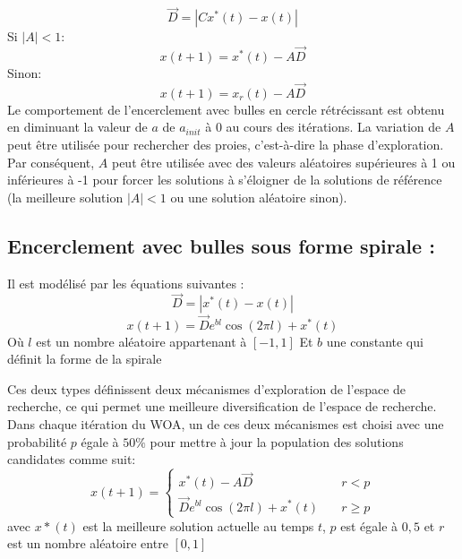 \documentclass[12pt]{article}
\begin{document}
\begin{equation*}
    \vec{D} = |Cx^*(t) - x(t)|
\end{equation*}
Si \(|A| < 1\):
\begin{equation}
    x(t+1) = x^*(t) - A\vec{D}
\end{equation}
Sinon:
\begin{equation}
    x(t+1) = x_r(t) - A\vec{D}
\end{equation}
Le comportement de l’encerclement avec bulles en cercle rétrécissant est obtenu en diminuant la valeur de \(a\) de \(a_{init}\) à 0 au cours des itérations. La variation de \(A\) peut être utilisée pour rechercher des proies, c'est-à-dire la phase d'exploration. Par conséquent, \(A\) peut être utilisée avec des valeurs aléatoires supérieures à 1 ou inférieures à -1 pour forcer les solutions à s'éloigner de la solutions de référence (la meilleure solution \(|A| < 1\) ou une solution aléatoire sinon).
\subsection{Encerclement avec bulles sous forme spirale :}
Il est modélisé par les équations suivantes :
\begin{equation}
    \vec{D} = |x^*(t) - x(t)|
\end{equation}
\begin{equation}
    x(t+1) = \vec{D} e^{bl} \cos (2\pi l) + x^*(t)
\end{equation}
Où \(l\) est un nombre aléatoire appartenant à \([-1,1]\) Et \(b\) une constante qui définit la forme de la spirale 

Ces deux types définissent deux mécanismes d’exploration de l’espace de recherche, ce qui permet une meilleure diversification de l’espace de recherche.
Dans chaque itération du WOA, un de ces deux mécanismes est choisi avec une probabilité \(p\) égale à \(50\%\) pour mettre à jour la population des solutions candidates comme suit:
\[ x(t+1) =
  \begin{cases}
    x^*(t) - A\vec{D}       & \quad r < p\\
    \vec{D} e^{bl} \cos (2\pi l) + x^*(t)  & \quad r \geq p
  \end{cases}
\]
avec \(x*(t)\) est la meilleure solution actuelle au temps \(t\), \(p\) est égale à \(0,5\) et \(r\) est un nombre aléatoire entre \([0, 1]\)
\end{document}
